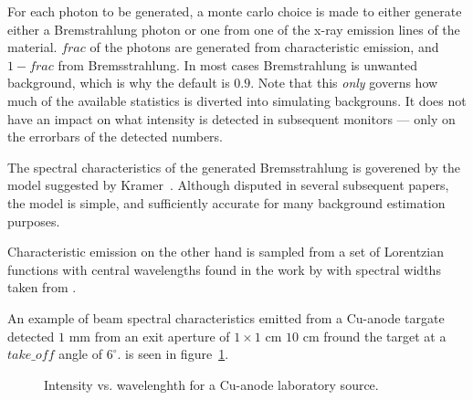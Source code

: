 For each photon to be generated, a monte carlo choice is made to either
generate either a Bremstrahlung photon or one from one of the x-ray emission
lines of the material. $frac$ of the photons are generated from characteristic
emission, and $1-frac$ from Bremsstrahlung. In most cases Bremstrahlung is
unwanted background, which is why the default is $0.9$. Note that this
\emph{only} governs how much of the available statistics is diverted into
simulating backgrouns. It does not have an impact on what intensity is detected
in subsequent monitors --- only on the errorbars of the detected numbers.

The spectral characteristics of the generated Bremsstrahlung is goverened by
the model suggested by Kramer~\cite{kramers1923}. Although disputed in several
subsequent papers, the model is simple, and sufficiently accurate for many
background estimation purposes.

Characteristic emission on the other hand is sampled from a set of Lorentzian
functions with central wavelengths found in the work by \cite{bearden1967x} with
spectral widths taken from \cite{krause1979natural}.

An example of beam spectral characteristics emitted from a Cu-anode targate detected $1$ mm  from an exit aperture of $1\times 1$ cm $10$ cm fround the target at a $take\_off$ angle of $6^\circ$. is seen in figure~\ref{f:source_lab_spectrum}.
\begin{figure}
\label{f:source_lab_spectrum}
\caption{Intensity vs. wavelenghth for a Cu-anode laboratory source.}
\end{figure}
